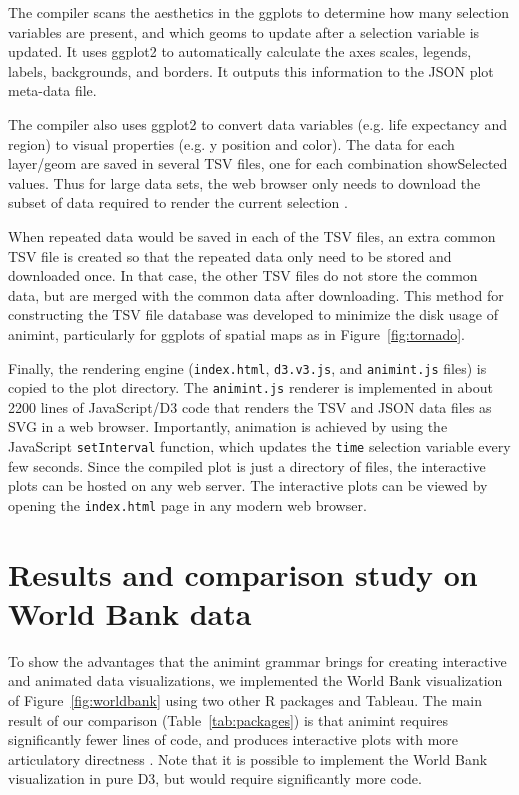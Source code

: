 \documentclass[journal]{vgtc}\usepackage[]{graphicx}\usepackage[]{color}
\begin{document}
The compiler scans the aesthetics in the ggplots to determine
how many selection variables are present, and which geoms to update
after a selection variable is updated. It uses ggplot2 to
automatically calculate the axes scales, legends, labels, backgrounds,
and borders. It outputs this information to the JSON plot meta-data
file.

The compiler also uses ggplot2 to convert data variables (e.g. life
expectancy and region) to visual properties (e.g. y position and
color). The data for each layer/geom are saved in several TSV files,
one for each combination showSelected values. Thus for large data
sets, the web browser only needs to download the subset of data
required to render the current selection \citep{2013-immens}.

When repeated data would be saved in each of the TSV files, an extra
common TSV file is created so that the repeated data only need to be
stored and downloaded once. In that case, the other TSV files do not
store the common data, but are merged with the common data after
downloading. This method for constructing the TSV file database was
developed to minimize the disk usage of animint, particularly
for ggplots of spatial maps as in Figure~\ref{fig:tornado}.

Finally, the rendering engine (\texttt{index.html}, \texttt{d3.v3.js},
and \texttt{animint.js} files) is copied to the plot directory. The
\texttt{animint.js} renderer is implemented in about 2200 lines of
JavaScript/D3 code that renders the TSV and JSON data files as SVG in
a web browser. Importantly, animation is achieved by using the
JavaScript \texttt{setInterval} function, which updates the
\texttt{time} selection variable every few seconds. Since the compiled
plot is just a directory of files, the interactive plots can be hosted
on any web server. The interactive plots can be viewed by opening the
\texttt{index.html} page in any modern web browser.

\section{Results and comparison study on World Bank data}
\label{sec:compare}

To show the advantages that the animint grammar brings for creating
interactive and animated data visualizations, we implemented the World
Bank visualization of Figure~\ref{fig:worldbank} using two other R packages and Tableau. The main result of our comparison (Table~\ref{tab:packages}) is that
animint requires significantly fewer lines of code, and produces
interactive plots with more articulatory directness
\citep{Hutchins:1985}. Note that it is possible to implement the World
Bank visualization in pure D3, but would require significantly more code.
\end{document}
